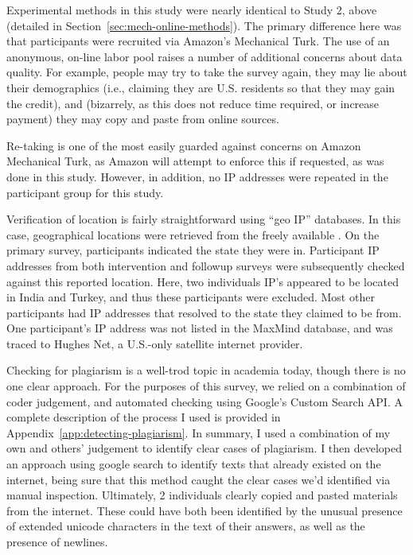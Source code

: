 Experimental methods in this study were nearly identical to Study 2, above
(detailed in Section~\ref{sec:mech-online-methods}). The primary difference here
was that participants were recruited via Amazon's Mechanical Turk. The use of an
anonymous, on-line labor pool raises a number of additional concerns about data
quality. For example, people may try to take the survey again, they may lie
about their demographics (i.e., claiming they are U.S. residents so that they
may gain the credit), and (bizarrely, as this does not reduce time required, or
increase payment) they may copy and paste from online sources.

Re-taking is one of the most easily guarded against concerns on Amazon
Mechanical Turk, as Amazon will attempt to enforce this if requested, as was
done in this study. However, in addition, no IP addresses were repeated in the
participant group for this study.

Verification of location is fairly straightforward using “geo IP” databases. In
this case, geographical locations were retrieved from the freely available
\textcite{maxmind-database}. On the primary survey, participants indicated the
state they were in. Participant IP addresses from both intervention and followup
surveys were subsequently checked against this reported location. Here, two
individuals IP’s appeared to be located in India and Turkey, and thus these
participants were excluded. Most other participants had IP addresses that
resolved to the state they claimed to be from. One participant’s IP address was
not listed in the MaxMind database, and was traced to Hughes Net, a U.S.-only
satellite internet provider.

Checking for plagiarism is a well-trod topic in academia today, though there is
no one clear approach. For the purposes of this survey, we relied on a
combination of coder judgement, and automated checking using Google’s Custom
Search API. A complete description of the process I used is provided in
Appendix~\ref{app:detecting-plagiarism}. In summary, I used a combination of my
own and others' judgement to identify clear cases of plagiarism. I then
developed an approach using google search to identify texts that already existed
on the internet, being sure that this method caught the clear cases we’d
identified via manual inspection. Ultimately, 2 individuals clearly 
copied and pasted materials from the internet. These could have both been
identified by the unusual presence of extended unicode characters in the text of
their answers, as well as the presence of newlines.

